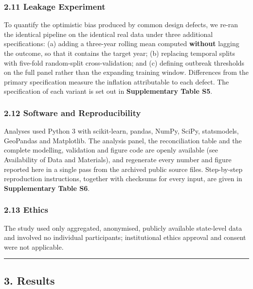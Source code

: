 \documentclass[
  10pt,
  twocolumn]{article}
\begin{document}
\subsubsection{2.11 Leakage Experiment}\label{leakage-experiment}

To quantify the optimistic bias produced by common design defects, we
re-ran the identical pipeline on the identical real data under three
additional specifications: (a) adding a three-year rolling mean computed
\textbf{without} lagging the outcome, so that it contains the target
year; (b) replacing temporal splits with five-fold random-split
cross-validation; and (c) defining outbreak thresholds on the full panel
rather than the expanding training window. Differences from the primary
specification measure the inflation attributable to each defect. The
specification of each variant is set out in \textbf{Supplementary Table
S5}.

\subsubsection{2.12 Software and
Reproducibility}\label{software-and-reproducibility}

Analyses used Python 3 with scikit-learn, pandas, NumPy, SciPy,
statsmodels, GeoPandas and Matplotlib. The analysis panel, the
reconciliation table and the complete modelling, validation and figure
code are openly available (see Availability of Data and Materials), and
regenerate every number and figure reported here in a single pass from
the archived public source files. Step-by-step reproduction
instructions, together with checksums for every input, are given in
\textbf{Supplementary Table S6}.

\subsubsection{2.13 Ethics}\label{ethics}

The study used only aggregated, anonymised, publicly available
state-level data and involved no individual participants; institutional
ethics approval and consent were not applicable.

\begin{center}\rule{0.5\linewidth}{0.5pt}\end{center}

\subsection{3. Results}\label{results}
\end{document}
